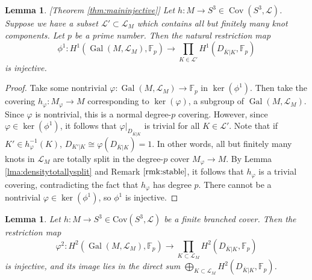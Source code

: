 \documentclass{amsart}
\theoremstyle{plain}
\theoremstyle{definition}
\theoremstyle{plain}
\theoremstyle{plain}
\theoremstyle{plain}
\newtheorem{lemma}[theorem]{Lemma}
\theoremstyle{remark}
\theoremstyle{remark}
\theoremstyle{plain}
\theoremstyle{definition}
\theoremstyle{plain}
\DeclareMathOperator{\Gal}{\mathrm{Gal}}
\DeclareMathOperator{\Cov}{\mathrm{Cov}}
\newcounter{main}
\theoremstyle{plain}
\theoremstyle{plain}
\numberwithin{equation}{section}
\begin{document}
\begin{lemma}\label{lma:injective}[Theorem \ref{thm:maininjective}]
Let $h: M \to S^3 \in \Cov(S^3, \mathcal{L})$. Suppose we have a subset $\mathcal{L}' \subset \mathcal{L}_M$ which contains all but finitely many knot components. Let $p$ be a prime number. Then the natural restriction map
\begin{equation}
    \phi^1: H^1(\Gal(M, \mathcal{L}_M), \mathbb{F}_p) \to \prod_{K \in \mathcal{L}'}H^1(D_{\overline{K}|K}, \mathbb{F}_p)
\end{equation}
is injective.
\end{lemma}

\begin{proof}
Take some nontrivial $\varphi: \Gal(M, \mathcal{L}_M) \to \mathbb{F}_p$ in $\ker(\phi^1)$. Then take the covering $h_\varphi: M_\varphi \to M$ corresponding to $\ker(\varphi)$, a subgroup of $\Gal(M, \mathcal{L}_M)$. Since $\varphi$ is nontrivial, this is a normal degree-$p$ covering. However, since $\varphi \in \ker(\phi^1)$, it follows that $\varphi|_{D_{\overline{K}|K}}$ is trivial for all $K \in \mathcal{L}'$. Note that if $K' \in h_\varphi^{-1}(K)$, $D_{K'|K} \cong \varphi(D_{\overline{K}|K}) = 1$. In other words, all but finitely many knots in $\mathcal{L}_M$ are totally split in the degree-$p$ cover $M_\varphi \to M$. By Lemma \ref{lma:densitytotallysplit} and Remark $\ref{rmk:stable}$, it follows that $h_\varphi$ is a trivial covering, contradicting the fact that $h_\varphi$ has degree $p$. There cannot be a nontrivial $\varphi \in \ker(\phi^1)$, so $\phi^1$ is injective. 
\end{proof}

\begin{lemma}\label{lma:injh2finite}
Let $h: M \to S^3 \in \mathrm{Cov}(S^3, \mathcal L)$ be a finite branched cover. Then the restriction map
\begin{equation}
    \varphi^2: H^2(\Gal(M, \mathcal L_M), \mathbb F_p) \to \prod_{K \subset \mathcal L_M}H^2(D_{\overline K|K}, \mathbb F_p)
\end{equation}
is injective, and its image lies in the direct sum $\bigoplus_{K \subset \mathcal L_M}H^2(D_{\overline K|K}, \mathbb F_p)$. 
\end{lemma}
\end{document}
